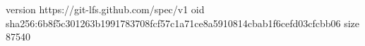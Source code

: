 version https://git-lfs.github.com/spec/v1
oid sha256:6b8f5c301263b1991783708fcf57c1a71ce8a5910814cbab1f6cefd03cfcbb06
size 87540
